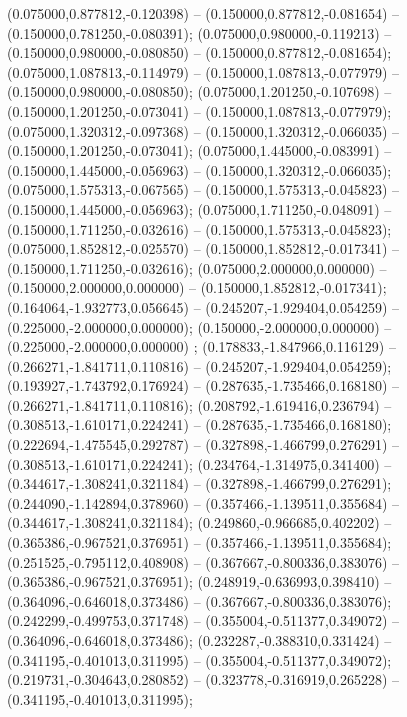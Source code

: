  (0.075000,0.877812,-0.120398) -- (0.150000,0.877812,-0.081654) -- (0.150000,0.781250,-0.080391);
 (0.075000,0.980000,-0.119213) -- (0.150000,0.980000,-0.080850) -- (0.150000,0.877812,-0.081654);
 (0.075000,1.087813,-0.114979) -- (0.150000,1.087813,-0.077979) -- (0.150000,0.980000,-0.080850);
 (0.075000,1.201250,-0.107698) -- (0.150000,1.201250,-0.073041) -- (0.150000,1.087813,-0.077979);
 (0.075000,1.320312,-0.097368) -- (0.150000,1.320312,-0.066035) -- (0.150000,1.201250,-0.073041);
 (0.075000,1.445000,-0.083991) -- (0.150000,1.445000,-0.056963) -- (0.150000,1.320312,-0.066035);
 (0.075000,1.575313,-0.067565) -- (0.150000,1.575313,-0.045823) -- (0.150000,1.445000,-0.056963);
 (0.075000,1.711250,-0.048091) -- (0.150000,1.711250,-0.032616) -- (0.150000,1.575313,-0.045823);
 (0.075000,1.852812,-0.025570) -- (0.150000,1.852812,-0.017341) -- (0.150000,1.711250,-0.032616);
 (0.075000,2.000000,0.000000) -- (0.150000,2.000000,0.000000) -- (0.150000,1.852812,-0.017341);
 (0.164064,-1.932773,0.056645) -- (0.245207,-1.929404,0.054259) -- (0.225000,-2.000000,0.000000);
 (0.150000,-2.000000,0.000000) -- (0.225000,-2.000000,0.000000) ;
 (0.178833,-1.847966,0.116129) -- (0.266271,-1.841711,0.110816) -- (0.245207,-1.929404,0.054259);
 (0.193927,-1.743792,0.176924) -- (0.287635,-1.735466,0.168180) -- (0.266271,-1.841711,0.110816);
 (0.208792,-1.619416,0.236794) -- (0.308513,-1.610171,0.224241) -- (0.287635,-1.735466,0.168180);
 (0.222694,-1.475545,0.292787) -- (0.327898,-1.466799,0.276291) -- (0.308513,-1.610171,0.224241);
 (0.234764,-1.314975,0.341400) -- (0.344617,-1.308241,0.321184) -- (0.327898,-1.466799,0.276291);
 (0.244090,-1.142894,0.378960) -- (0.357466,-1.139511,0.355684) -- (0.344617,-1.308241,0.321184);
 (0.249860,-0.966685,0.402202) -- (0.365386,-0.967521,0.376951) -- (0.357466,-1.139511,0.355684);
 (0.251525,-0.795112,0.408908) -- (0.367667,-0.800336,0.383076) -- (0.365386,-0.967521,0.376951);
 (0.248919,-0.636993,0.398410) -- (0.364096,-0.646018,0.373486) -- (0.367667,-0.800336,0.383076);
 (0.242299,-0.499753,0.371748) -- (0.355004,-0.511377,0.349072) -- (0.364096,-0.646018,0.373486);
 (0.232287,-0.388310,0.331424) -- (0.341195,-0.401013,0.311995) -- (0.355004,-0.511377,0.349072);
 (0.219731,-0.304643,0.280852) -- (0.323778,-0.316919,0.265228) -- (0.341195,-0.401013,0.311995);
